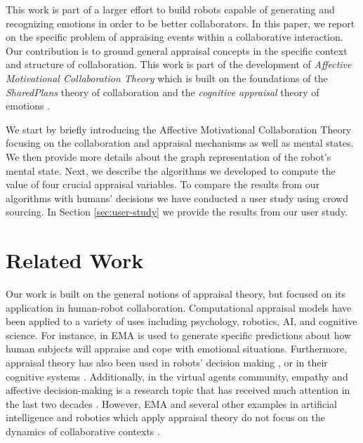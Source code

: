 \documentclass{aamas2016}
\begin{document}
This work is part of a larger effort to build robots capable of generating and
recognizing emotions in order to be better collaborators. In this paper, we
report on the specific problem of appraising events within a collaborative
interaction. Our contribution is to ground general appraisal concepts in the
specific context and structure of collaboration. This work is part of the
development of \textit{Affective Motivational Collaboration Theory} which is
built on the foundations of the \textit{SharedPlans} theory of collaboration
\cite{grosz:plans-discourse} and the \textit{cognitive appraisal} theory of
emotions \cite{gratch:domain-independent}.

We start by briefly introducing the Affective Motivational Collaboration Theory
focusing on the collaboration and appraisal mechanisms as well as mental states.
We then provide more details about the graph representation of the robot's
mental state. Next, we describe the algorithms we developed to compute the
value of four crucial appraisal variables. To compare the results from our
algorithms with humans' decisions we have conducted a user study using crowd
sourcing. In Section \ref{sec:user-study} we provide the results from our user
study.

\section{Related Work}
Our work is built on the general notions of appraisal theory, but focused on its
application in human-robot collaboration. Computational appraisal models have
been applied to a variety of uses including psychology, robotics, AI, and
cognitive science. For instance, in \cite{marsella:ema-process-model} EMA is
used to generate specific predictions about how human subjects will appraise and
cope with emotional situations. Furthermore, appraisal theory has also been used
in robots' decision making \cite{castro:autonomous-robot-fear}, or in their
cognitive systems
\cite{hudlicka:emotinos-reasons,marinier:emotion-reinforcement}. Additionally,
in the virtual agents community, empathy and affective decision-making is a
research topic that has received much attention in the last two decades
\cite{scott:modeling-empathy-agent,paiva:agent-care,pontier:women-robot-men,velasquez:emotions-motivations-agents}.
However, EMA and several other examples in artificial intelligence and robotics
which apply appraisal theory do not focus on the dynamics of collaborative
contexts
\cite{adam:bdi-emotional-companion,kim:model-hri-appraisal,marsella:ema-process-model,rosenbloom:sigma-appraisal}.
\end{document}
